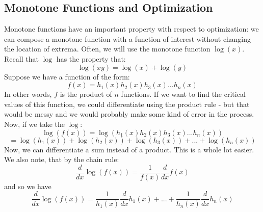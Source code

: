 \documentclass[12pt,a4paper]{article} %
\begin{document}
\newpage
\subsection{Monotone Functions and Optimization}
Monotone functions have an important property with respect to optimization: we can compose a monotone function with a function of interest without changing the location of extrema.  Often, we will use the monotone function $\log(x)$. Recall that $\log$ has the property that:
$$\log(xy) = \log(x) + \log(y)$$
Suppose we have a function of the form:
$$f(x) = h_1(x)h_2(x)h_3(x)...h_n(x)$$
In other words, $f$ is the product of $n$ functions.  If we want to find the critical values of this function, we could differentiate using the product rule - but that would be messy and we would probably make some kind of error in the process.  Now, if we take the $\log$:
$$\log(f(x)) = \log(h_1(x)h_2(x)h_3(x)...h_n(x))$$
$$= \log(h_1(x))+ \log(h_2(x))+\log(h_3(x))+...+\log(h_n(x))$$
Now, we can differentiate a sum instead of a product.  This is a whole lot easier.  We also note, that by the chain rule:
$$\frac{d}{dx}\log(f(x)) = \frac{1}{f(x)}\frac{d}{dx}f(x)$$
and so we have
$$\frac{d}{dx}\log(f(x)) = \frac{1}{h_1(x)}\frac{d}{dx}h_1(x)+...+\frac{1}{h_n(x)}\frac{d}{dx}h_n(x)$$
\end{document}
